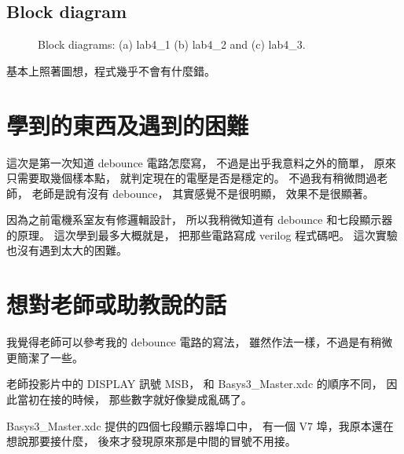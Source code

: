 \documentclass{article}
\begin{document}
\begin{CJK}{UTF8}{bsmi}
\subsection{Block diagram}
\begin{figure}[]
\caption{Block diagrams: (a) lab4\_1 (b) lab4\_2 and (c) lab4\_3.}
\end{figure}
基本上照著圖想，程式幾乎不會有什麼錯。

\section{學到的東西及遇到的困難}
這次是第一次知道 debounce 電路怎麼寫，
不過是出乎我意料之外的簡單，
原來只需要取幾個樣本點，
就判定現在的電壓是否是穩定的。
不過我有稍微問過老師，
老師是說有沒有 debounce，
其實感覺不是很明顯，
效果不是很顯著。

因為之前電機系室友有修邏輯設計，
所以我稍微知道有 debounce 和七段顯示器的原理。
這次學到最多大概就是，
把那些電路寫成 verilog 程式碼吧。
這次實驗也沒有遇到太大的困難。

\section{想對老師或助教說的話}
我覺得老師可以參考我的 debounce 電路的寫法，
雖然作法一樣，不過是有稍微更簡潔了一些。

老師投影片中的 DISPLAY 訊號 MSB，
和 Basys3\_Master.xdc 的順序不同，
因此當初在接的時候，
那些數字就好像變成亂碼了。

Basys3\_Master.xdc 提供的四個七段顯示器埠口中，
有一個 V7 埠，我原本還在想說那要接什麼，
後來才發現原來那是中間的冒號不用接。

\end{CJK}
\end{document}

